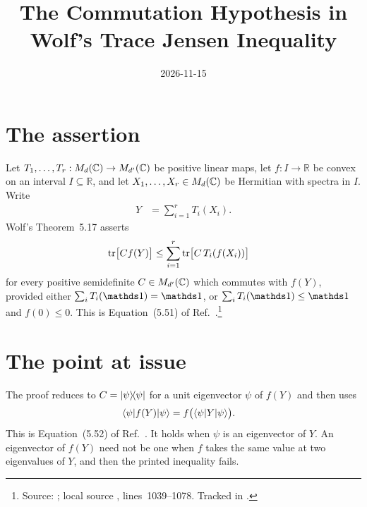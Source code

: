 \documentclass{article}
\title{The Commutation Hypothesis in Wolf's Trace Jensen Inequality}
\author{}
\date{2026-11-15}
\begin{document}
\maketitle
{}

\section{The assertion}

Let $T_1,\ldots,T_r:M_{d}(\mathbb{C})\to M_{d'}(\mathbb{C})$ be positive linear maps, let
$f:I\to\mathbb R$ be convex on an interval $I\subseteq\mathbb R$, and let
$X_1,\ldots,X_r\in M_{d}(\mathbb{C})$ be Hermitian with spectra in $I$. Write
\begin{align}
    Y&=\sum_{i=1}^rT_i(X_i).
    \label{eq:wolf_ch5_trace_jensen_commutation_argument}
\end{align}
Wolf's Theorem~5.17 asserts
\begin{align}
    \operatorname{tr}\bigl[C f(Y)\bigr]
        &\leq\sum_{i=1}^r\operatorname{tr}\bigl[C\,T_i(f(X_i))\bigr]
    \label{eq:wolf_ch5_trace_jensen_commutation_printed_inequality}
\end{align}
for every positive semidefinite $C\in M_{d'}(\mathbb{C})$ which commutes with $f(Y)$,
provided either $\sum_iT_i(\Id)=\Id$, or $\sum_iT_i(\Id)\leq\Id$ and
$f(0)\leq0$. This is Equation~(5.51) of Ref.~\cite{Wolf2012Quantum}.\footnote{Source:
    \cite[Theorem~5.17 and Equations~(5.51)--(5.53)]{Wolf2012Quantum}; local
    source ,
    lines~1039--1078. Tracked in .}

\section{The point at issue}

The proof reduces to $C=|\psi\rangle\!\langle \psi|$ for a unit eigenvector $\psi$ of
$f(Y)$ and then uses
\begin{align}
    \langle \psi|f(Y)|\psi\rangle
        &=f\bigl(\langle \psi|Y|\psi\rangle\bigr).
    \label{eq:wolf_ch5_trace_jensen_commutation_eigenvector_step}
\end{align}
This is Equation~(5.52) of Ref.~\cite{Wolf2012Quantum}. It holds when $\psi$
is an eigenvector of $Y$. An eigenvector of $f(Y)$ need not be one when $f$
takes the same value at two eigenvalues of $Y$, and then the printed
inequality fails.
\end{document}
